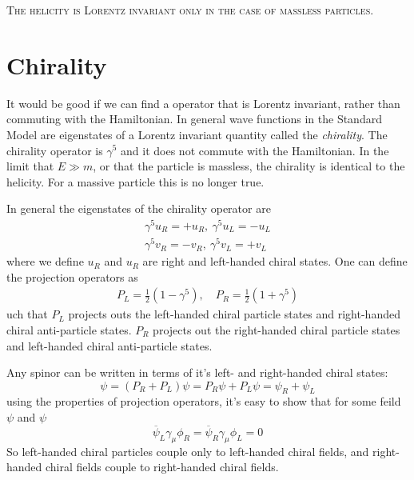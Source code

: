 \textsc{The helicity is Lorentz invariant only in the case of massless particles.}
\section{\label{sec:chirality}Chirality}
It would be good if we can find a operator that is Lorentz invariant, rather than commuting with the Hamiltonian. In general wave functions in the Standard Model are eigenstates of a Lorentz invariant quantity called the \textit{chirality}. The chirality operator is \(\gamma ^5\) and it does not commute with the Hamiltonian. 
In the limit that \(E \gg m\), or that the particle is massless, the chirality is identical to the helicity. For a massive particle this is no longer true.

In general the eigenstates of the chirality operator are
\begin{equation}
    \begin{gathered}
        \gamma ^5 u_R = + u_R, ~ \gamma ^5 u_L = - u_L\\
        \gamma ^5 v_R = - v_R, ~ \gamma ^5 v_L = + v_L
    \end{gathered}
\end{equation}
where we define \(u_R\) and \( u_R\) are right and left-handed chiral states. One can define the projection operators as 
\begin{equation}
    \begin{gathered}
    P_L = \frac{1}{2} (1 - \gamma^5), \quad P_R = \frac{1}{2} (1 + \gamma^5)
\end{gathered}
\end{equation}
uch that $P_L$ projects outs the left-handed chiral particle states and right-handed chiral anti-particle states. $P_R$ projects out the right-handed chiral particle states and left-handed chiral anti-particle states.

Any spinor can be written in terms of it’s left- and right-handed chiral states:
\begin{equation}
    \psi = (P_R + P_L)\psi  = P_R \psi + P_L\psi = \psi _R + \psi _L
\end{equation}
using the properties of projection operators, it's easy to show that for some feild \(\psi\) and \(\psi\)
\begin{equation}
    \overline {\psi}_L \gamma_\mu \phi _R = \overline {\psi}_R \gamma_\mu \phi _L = 0
\end{equation}
So left-handed chiral particles couple only to left-handed chiral fields, and right-handed chiral fields couple to right-handed chiral fields.

